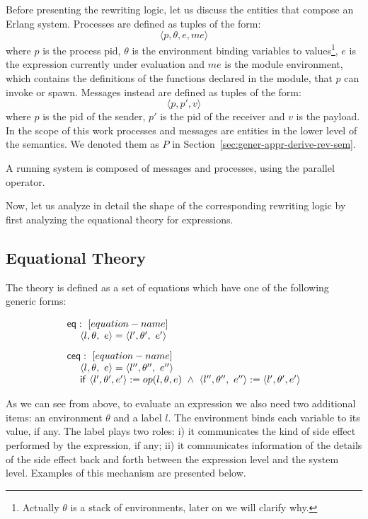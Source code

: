 \documentclass{article}[12pt,a4paper]
\theoremstyle{definition}
\begin{document}
Before presenting the rewriting logic, let us
discuss the entities that compose an Erlang system.
Processes are defined as tuples of the form:
\[\langle p, \theta, e, me \rangle\]
where $p$ is the process pid, $\theta$ is the environment binding variables to
values\footnote{Actually $\theta$ is a stack of environments, later on we will clarify
  why. }, $e$ is the expression currently under evaluation and $me$ is the
module environment, which contains the definitions of the functions declared in the module, that $p$ can invoke or
spawn.
Messages instead are defined as tuples of the form:
\[\langle p, p', v \rangle\]
where $p$ is the pid of the sender, $p'$ is the pid of the receiver and $v$ is
the payload. In the scope of this work processes and messages are entities in the
lower level of the semantics. We denoted them as $P$ in Section~\ref{sec:gener-appr-derive-rev-sem}.

A running system is composed of messages and processes, using the
parallel operator.

Now, let us analyze in detail the shape of the corresponding rewriting logic by
first analyzing the equational theory for expressions.

\subsection{Equational Theory}
The theory is defined as a set of equations which have one of the following generic forms:

\[
  \begin{array}{l}
    \mathsf{eq}:~[equation-name]\\
    ~~~~\langle l,\theta,~e \rangle = \langle l',\theta',~e' \rangle\\[2ex]

    \mathsf{ceq}:~[equation-name]\\
    ~~~~\langle l,\theta,~e \rangle = \langle l'',\theta'',~e'' \rangle\\
    ~~~~\mathsf{if}~\langle l', \theta', e'\rangle :=op(l,\theta,e)~\wedge~\langle
    l'',\theta'',~e'' \rangle := \langle l',\theta',e'\rangle

  \end{array}
\]

As we can see from above, to evaluate an expression we also need two additional items:
an environment $\theta$ and a label $l$. The environment binds each variable to its
value, if any. The label plays two roles:
i) it communicates the kind of side effect performed by the expression, if any; ii) it communicates information of the details of the side effect back and
forth between the expression level and the system level. Examples of this mechanism are presented below.
\end{document}
